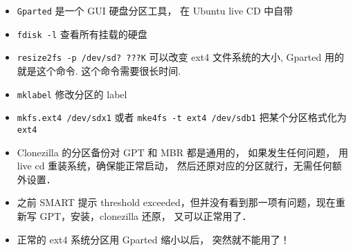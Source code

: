 
\begin{issues}
\issueDraft
\end{issues}

\begin{itemize}
\item \verb|Gparted| 是一个 GUI 硬盘分区工具， 在 Ubuntu live CD 中自带
\item \verb|fdisk -l| 查看所有挂载的硬盘
\item \verb|resize2fs -p /dev/sd? ???K| 可以改变 ext4 文件系统的大小, Gparted 用的就是这个命令. 这个命令需要很长时间.
\item \verb|mklabel| 修改分区的 label
\item \verb|mkfs.ext4 /dev/sdx1| 或者 \verb|mke4fs -t ext4 /dev/sdb1| 把某个分区格式化为 \verb|ext4|
\item Clonezilla 的分区备份对 GPT 和 MBR 都是通用的， 如果发生任何问题， 用 live cd 重装系统，确保能正常启动， 然后还原对应的分区就行，无需任何额外设置．
\item 之前 SMART 提示 threshold exceeded，但并没有看到那一项有问题，现在重新写 GPT，安装，clonezilla 还原， 又可以正常用了．
\item  正常的 ext4 系统分区用 Gparted 缩小以后， 突然就不能用了！
\end{itemize}
